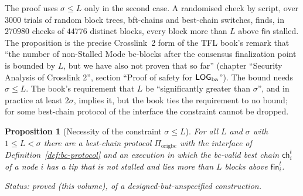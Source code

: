 \documentclass[11pt,a4paper]{article}
\newtheorem{proposition}[theorem]{Proposition}
\theoremstyle{definition}
\newcommand{\ch}{\mathsf{ch}}
\newcommand{\Piorigbc}{\Pi_{\mathrm{origbc}}}
\newcommand{\fin}{\mathsf{fin}}
\begin{document}
The proof uses $\sigma \le L$ only in the second case. A randomised check by
script, over $3000$ trials of random block trees, bft-chains and best-chain
switches, finds, in $270980$ checks of $44776$ distinct blocks, every block
more than $L$ above $\fin$ stalled.
The proposition is the precise Crosslink~2 form of the TFL book's remark
that ``the number of non-Stalled Mode bc-blocks after the consensus
finalization point is bounded by $L$, but we have also not proven that so
far'' (chapter ``Security Analysis of Crosslink 2'', section ``Proof of
safety for $\LOGba$''). The bound needs $\sigma \le L$. The book's
requirement that $L$ be ``significantly greater than $\sigma$'', and in
practice at least $2\sigma$, implies it, but the book ties the requirement to
no bound; for some best-chain protocol of the interface the constraint cannot
be dropped.

\begin{proposition}[Necessity of the constraint $\sigma \le L$]
\label{prop:short-L}
For all $L$ and $\sigma$ with $1 \le L < \sigma$ there are a best-chain
protocol $\Piorigbc$ with the interface of Definition~\ref{def:bc-protocol}
and an execution in which the bc-valid best chain $\ch_i^t$ of a node $i$
has a tip that is not stalled and lies more than $L$ blocks above
$\fin_i^t$.

Status: proved (this volume), of a designed-but-unspecified construction.
\end{proposition}
\end{document}
